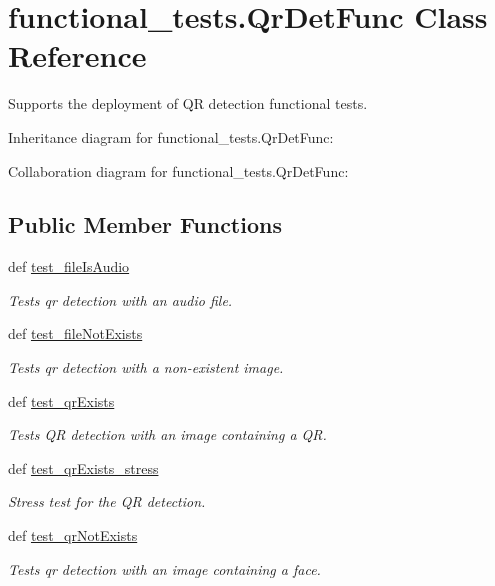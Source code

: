 \hypertarget{classfunctional__tests_1_1QrDetFunc}{\section{functional\-\_\-tests.\-Qr\-Det\-Func Class Reference}
\label{classfunctional__tests_1_1QrDetFunc}
}


Supports the deployment of Q\-R detection functional tests.  




Inheritance diagram for functional\-\_\-tests.\-Qr\-Det\-Func\-:


Collaboration diagram for functional\-\_\-tests.\-Qr\-Det\-Func\-:
\subsection*{Public Member Functions}
\begin{DoxyCompactItemize}
\item 
def \hyperlink{classfunctional__tests_1_1QrDetFunc_ab9e7744d7466cd2d6239acff3ed34482}{test\-\_\-file\-Is\-Audio}
\begin{DoxyCompactList}\small\item\em Tests qr detection with an audio file. \end{DoxyCompactList}\item 
def \hyperlink{classfunctional__tests_1_1QrDetFunc_a50f699dc407c7dd60c0c1b92d294358c}{test\-\_\-file\-Not\-Exists}
\begin{DoxyCompactList}\small\item\em Tests qr detection with a non-\/existent image. \end{DoxyCompactList}\item 
def \hyperlink{classfunctional__tests_1_1QrDetFunc_a9991befad3e56709f97095e86a333b44}{test\-\_\-qr\-Exists}
\begin{DoxyCompactList}\small\item\em Tests Q\-R detection with an image containing a Q\-R. \end{DoxyCompactList}\item 
def \hyperlink{classfunctional__tests_1_1QrDetFunc_a821119292e7d339f39e71007319b7f65}{test\-\_\-qr\-Exists\-\_\-stress}
\begin{DoxyCompactList}\small\item\em Stress test for the Q\-R detection. \end{DoxyCompactList}\item 
def \hyperlink{classfunctional__tests_1_1QrDetFunc_a368936a40e7324ea46ae3e920f25a70a}{test\-\_\-qr\-Not\-Exists}
\begin{DoxyCompactList}\small\item\em Tests qr detection with an image containing a face. \end{DoxyCompactList}\end{DoxyCompactItemize}


